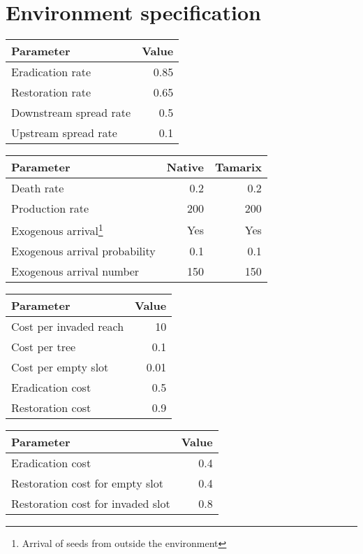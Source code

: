 \chapter{Environment specification}
\label{ap:environment_spec}

\begin{table}[H]
\centering
{}
\label{tab:dynamic_params_common} 
\begin{tabular}{l r}
 \toprule
 Parameter & Value \\
 \midrule
 Eradication rate & 0.85 \\
 Restoration rate & 0.65 \\
 Downstream spread rate & 0.5 \\
 Upstream spread rate & 0.1 \\
 \bottomrule
\end{tabular}
\end{table}

\begin{table}[H]
\centering
{} \label{tab:dynamic_params_not_common}
\begin{tabular}{lrr}
\toprule
 Parameter & Native & Tamarix \\
 \midrule
 Death rate & 0.2 & 0.2 \\
 Production rate & 200 & 200 \\
 Exogenous arrival\footnote{Arrival of seeds from outside the environment} & Yes & Yes \\
 Exogenous arrival probability & 0.1 & 0.1 \\
 Exogenous arrival number & 150 & 150 \\
 \bottomrule
\end{tabular}
\end{table}

\begin{table}[H]
\centering
{} \label{tab:cost_params} 
\begin{tabular}{lr}
 \toprule
 Parameter & Value \\
 \midrule
 Cost per invaded reach & 10 \\
 Cost per tree & 0.1 \\
 Cost per empty slot & 0.01 \\
 Eradication cost & 0.5 \\
 Restoration cost & 0.9 \\
 \bottomrule
\end{tabular}
\end{table}

\begin{table}[H]
\centering
 \begin{tabular}{lr}
 \toprule
 Parameter & Value \\
 \midrule
 Eradication cost & 0.4 \\
 Restoration cost for empty slot & 0.4 \\
 Restoration cost for invaded slot & 0.8 \\
 \bottomrule
\end{tabular}
\label{tab:cost_params_var}
\end{table}
